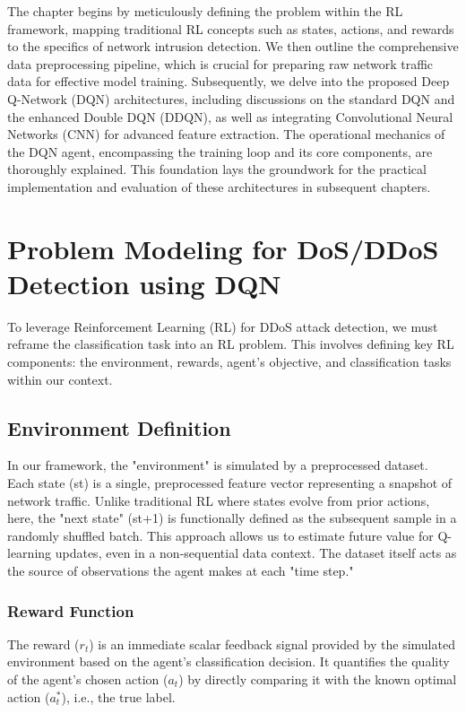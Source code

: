 \documentclass{report}
\begin{document}
The chapter begins by meticulously defining the problem within the RL framework, mapping traditional RL concepts such as states, actions, and rewards to the specifics of network intrusion detection. We then outline the comprehensive data preprocessing pipeline, which is crucial for preparing raw network traffic data for effective model training. Subsequently, we delve into the proposed Deep Q-Network (DQN) architectures, including discussions on the standard DQN and the enhanced Double DQN (DDQN), as well as integrating Convolutional Neural Networks (CNN) for advanced feature extraction. The operational mechanics of the DQN agent, encompassing the training loop and its core components, are thoroughly explained. This foundation lays the groundwork for the practical implementation and evaluation of these architectures in subsequent chapters.

\section{Problem Modeling for DoS/DDoS Detection using DQN}

To leverage Reinforcement Learning (RL) for DDoS attack detection, we must reframe the classification task into an RL problem. This involves defining key RL components: the environment, rewards, agent's objective, and classification tasks within our context.

\subsection{Environment Definition}
In our framework, the "environment" is simulated by a preprocessed dataset. Each state (st​) is a single, preprocessed feature vector representing a snapshot of network traffic. Unlike traditional RL where states evolve from prior actions, here, the "next state" (st+1​) is functionally defined as the subsequent sample in a randomly shuffled batch. This approach allows us to estimate future value for Q-learning updates, even in a non-sequential data context. The dataset itself acts as the source of observations the agent makes at each "time step."

\subsubsection{Reward Function}

The reward ($r_t$) is an immediate scalar feedback signal provided by the simulated environment based on the agent's classification decision. It quantifies the quality of the agent’s chosen action ($a_t$) by directly comparing it with the known optimal action ($a_t^*$), i.e., the true label.
\end{document}
